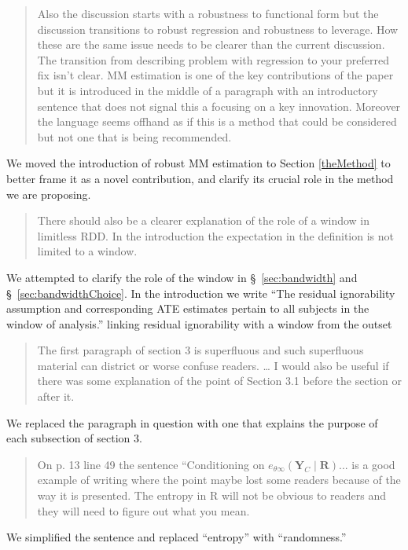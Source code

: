 \documentclass[12pt]{article}
\begin{document}
\begin{quote}
Also the discussion starts with a robustness to functional form but
the discussion transitions to robust regression and robustness to
leverage. How these are the same issue needs to be clearer than the
current discussion. The transition from describing problem with
regression to your preferred fix isn’t clear. MM estimation is one of
the key contributions of the paper but it is introduced in the middle
of a paragraph with an introductory sentence that does not signal this
a focusing on a key innovation. Moreover the language seems offhand as
if this is a method that could be considered but not one that is being
recommended.
\end{quote}
We moved the introduction of robust MM estimation to Section
\ref{theMethod} to better frame it as a novel contribution, and
clarify its crucial role in the method we are proposing.

\begin{quote}
There should also be a clearer explanation of the role of a window in
limitless RDD. In the introduction the expectation in the definition
is not limited to a window.
\end{quote}
We attempted to clarify the role of the window in
\S~\ref{sec:bandwidth} and \S~\ref{sec:bandwidthChoice}. In the
introduction we write ``The residual ignorability assumption and corresponding ATE
estimates pertain to all subjects in the window of analysis.'' linking
residual ignorability with a window from the outset 

\begin{quote}
The first paragraph of section 3 is superfluous and such superfluous
material can district or worse confuse readers. \dots
I would also be useful if there
was some explanation of the point of Section 3.1 before the section or
after it.
\end{quote}
We replaced the paragraph in question with one that explains the
purpose of each subsection of section 3.

\begin{quote}
On p. 13 line 49 the sentence “Conditioning on $e_{\theta\infty}(\mathbf{Y}_C \mid \mathbf{R})$... is a good example of
writing where the point maybe lost some readers because of the way it
is presented. The entropy in R will not be obvious to readers and they
will need to figure out what you mean.
\end{quote}
We simplified the sentence and replaced ``entropy'' with
``randomness.''
\end{document}
